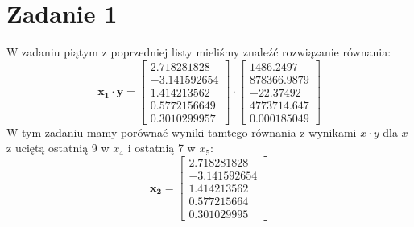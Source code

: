 \documentclass{article}
\begin{document}





\section*{Zadanie 1}
W zadaniu piątym z poprzedniej listy mieliśmy znaleźć rozwiązanie równania:
\[
\mathbf{x_1} \cdot \mathbf{y} = 
\begin{bmatrix}
2.718281828 \\
-3.141592654 \\
1.414213562 \\
0.5772156649 \\
0.3010299957
\end{bmatrix} \cdot
\begin{bmatrix}
1486.2497 \\
878366.9879 \\
-22.37492 \\
4773714.647 \\
0.000185049
\end{bmatrix}
\]
W tym zadaniu mamy porównać wyniki tamtego równania z
wynikami $x\cdot y$ dla $x$ z uciętą ostatnią 9 w $x_4$
i ostatnią 7 w $x_5$:
\[
\mathbf{x_2} = 
\begin{bmatrix}
2.718281828 \\
-3.141592654 \\
1.414213562 \\
0.577215664 \\
0.301029995
\end{bmatrix}
\]
\end{document}
